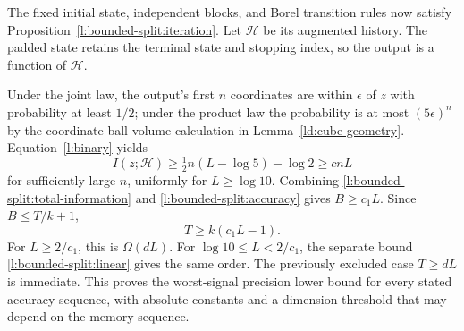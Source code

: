 The fixed initial state, independent blocks, and Borel transition rules
now satisfy Proposition~\ref{l:bounded-split:iteration}.  Let
\(\mathcal H\) be its augmented history.  The padded state retains
the terminal state and stopping index, so the output is a function of
\(\mathcal H\).

Under the joint law, the output's first \(n\) coordinates are within
\(\epsilon\) of \(z\)
with probability at least \(1/2\); under the product law the
probability is at most \((5\epsilon)^n\) by the coordinate-ball
volume calculation in Lemma~\ref{ld:cube-geometry}.
Equation~\eqref{l:binary} yields
\begin{equation}\label{l:bounded-split:accuracy}
 I(z;\mathcal H)\ge\tfrac12n(L-\log5)-\log2\ge cnL
\end{equation}
for sufficiently large \(n\), uniformly for \(L\ge\log10\).
Combining \eqref{l:bounded-split:total-information} and
\eqref{l:bounded-split:accuracy} gives \(B\ge c_1L\).
Since \(B\le T/k+1\),
\[
 T\ge k(c_1L-1).
\]
For \(L\ge2/c_1\), this is \(\Omega(dL)\).
For \(\log10\le L<2/c_1\), the separate bound
\eqref{l:bounded-split:linear} gives the same order.
The previously excluded case \(T\ge dL\) is immediate.  This proves
the worst-signal precision lower bound for every stated accuracy
sequence, with absolute constants and a dimension threshold that may
depend on the memory sequence.
